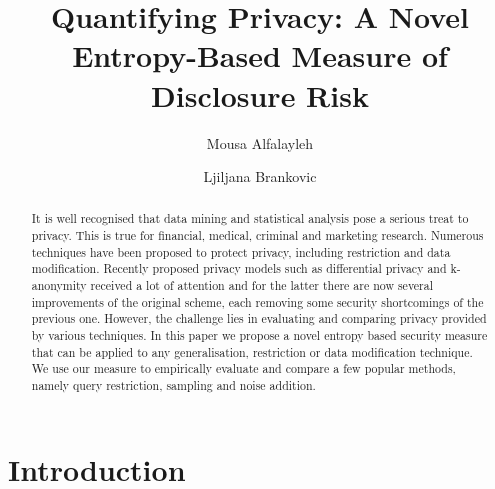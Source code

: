 \documentclass{llncs}
\begin{document}
\pagestyle{headings}   \mainmatter              
\title{Quantifying Privacy: A Novel Entropy-Based Measure of Disclosure Risk}
  \author{Mousa Alfalayleh \and Ljiljana Brankovic}


\maketitle

\begin{abstract}
It is well recognised that data mining and statistical analysis pose a serious treat to privacy. This is true for  financial, medical, criminal and marketing research. Numerous techniques have been proposed to protect privacy, including restriction and data modification. Recently proposed privacy models such as differential privacy and  k-anonymity received a lot of attention and  for the latter there are now several improvements of the original scheme, each removing some security shortcomings of the previous one. However, the challenge lies in evaluating and comparing privacy provided by various techniques. In this paper we propose a novel entropy based security measure that can be applied to any generalisation, restriction or data modification technique. We use our measure to empirically evaluate and compare a few popular methods, namely query restriction, sampling and noise addition.
\end{abstract}
\section{Introduction}
\end{document}
